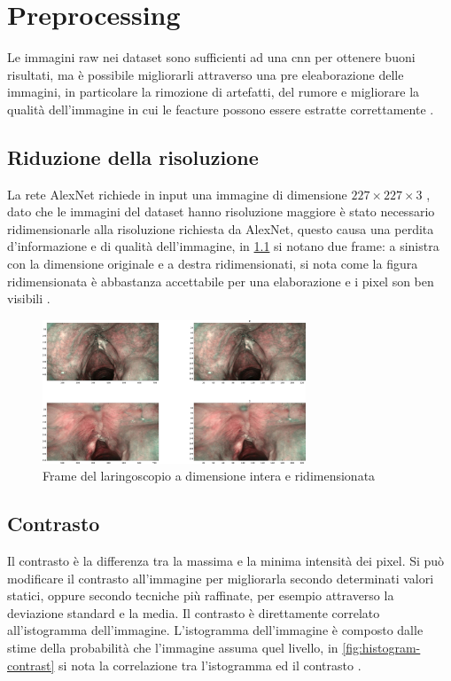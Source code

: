 \chapter{Preprocessing}\label{preprocessing}

Le immagini raw nei dataset sono sufficienti ad una \gls{cnn} per ottenere buoni risultati, ma è possibile migliorarli attraverso una pre eleaborazione delle immagini, in particolare la rimozione di artefatti,  del rumore e migliorare la qualità dell'immagine 
in cui le feacture  possono essere estratte correttamente \cite{permual_contrast}.

\section{Riduzione della risoluzione}\label{riduzione-della-risoluzione}

La rete AlexNet richiede in input una immagine di dimensione \(227 \times 227 \times 3\) \cite{alexnet}, dato che le immagini del dataset hanno risoluzione maggiore è stato necessario ridimensionarle alla risoluzione richiesta da AlexNet, questo causa una perdita d'informazione e di qualità dell'immagine, in \cref{fig:resize} si notano due frame: a sinistra con la dimensione originale e a destra ridimensionati, si nota come la figura ridimensionata è abbastanza accettabile per una elaborazione e i pixel son ben visibili \cite{gonzalez_dip}.

\begin{figure}[ht]
    \centering
    \includegraphics[width=0.7\textwidth]{preprocessing/resize.pdf}
    \caption{Frame del laringoscopio a dimensione intera e ridimensionata}
    \label{fig:resize}
\end{figure}

\section{Contrasto}\label{contrasto}

Il contrasto è la differenza tra la massima e la minima
intensità dei pixel. Si può modificare il contrasto all'immagine per migliorarla secondo determinati valori statici, oppure secondo tecniche più raffinate, per esempio attraverso la deviazione standard e la media. Il contrasto è direttamente correlato all'istogramma dell'immagine. L'istogramma dell'immagine è composto dalle stime della probabilità che l'immagine assuma quel livello, in \cref{fig:histogram-contrast} si nota la correlazione tra l'istogramma ed il contrasto \cite{permual_contrast}  \cite{hummel_histogram} \cite{pandey_contrast} \cite{gonzalez_dip}.

